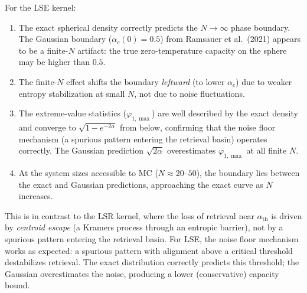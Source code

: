 \documentclass[11pt]{article}
\begin{document}
For the LSE kernel:
\begin{enumerate}
\item The exact spherical density correctly predicts the $N \to \infty$ phase boundary.  The Gaussian boundary ($\alpha_c(0) = 0.5$) from Ramsauer et al.\ (2021) appears to be a finite-$N$ artifact: the true zero-temperature capacity on the sphere may be higher than $0.5$.
\item The finite-$N$ effect shifts the boundary \emph{leftward} (to lower $\alpha_c$) due to weaker entropy stabilization at small $N$, not due to noise fluctuations.
\item The extreme-value statistics ($\varphi_{1,\max}$) are well described by the exact density and converge to $\sqrt{1 - e^{-2\alpha}}$ from below, confirming that the noise floor mechanism (a spurious pattern entering the retrieval basin) operates correctly.  The Gaussian prediction $\sqrt{2\alpha}$ overestimates $\varphi_{1,\max}$ at all finite $N$.
\item At the system sizes accessible to MC ($N \approx 20$--$50$), the boundary lies between the exact and Gaussian predictions, approaching the exact curve as $N$ increases.
\end{enumerate}

This is in contrast to the LSR kernel, where the loss of retrieval near $\alpha_{\mathrm{th}}$ is driven by \emph{centroid escape} (a Kramers process through an entropic barrier), not by a spurious pattern entering the retrieval basin.  For LSE, the noise floor mechanism works as expected: a spurious pattern with alignment above a critical threshold destabilizes retrieval.  The exact distribution correctly predicts this threshold; the Gaussian overestimates the noise, producing a lower (conservative) capacity bound.
\end{document}
